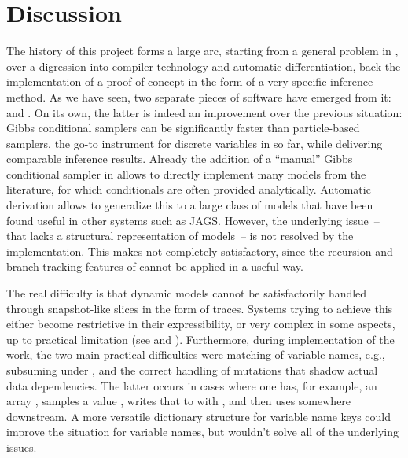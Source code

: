 \chapter{Discussion}
\label{cha:discussion}

The history of this project forms a large arc, starting from a general problem in \turingjl{}, over
a digression into compiler technology and automatic differentiation, back the implementation of a
proof of concept in the form of a very specific inference method.  As we have seen, two separate
pieces of software have emerged from it: \irtrackerjl{} and \autogibbsjl{}.  On its own, the latter
is indeed an improvement over the previous situation: Gibbs conditional samplers can be
significantly faster than particle-based samplers, the go-to instrument for discrete variables in
\turingjl{} so far, while delivering comparable inference results.  Already the addition of a
\enquote{manual} Gibbs conditional sampler in \turingjl{} allows to directly implement many models
from the literature, for which conditionals are often provided analytically.  Automatic derivation
allows to generalize this to a large class of models that have been found useful in other systems
such as JAGS.  However, the underlying issue~-- that \turingjl{} lacks a structural representation
of models~-- is not resolved by the implementation.  This makes \autogibbsjl{} not
completely satisfactory, since the recursion and branch tracking features of \irtrackerjl{} cannot
be applied in a useful way.

The real difficulty is that dynamic models cannot be satisfactorily handled through snapshot-like
slices in the form of traces.  Systems trying to achieve this either become restrictive in their
expressibility, or very complex in some aspects, up to practical limitation (see
\textcite{mansinghka2014venture} and \textcite{goodman2012church}).  Furthermore, during
implementation of the work, the two main practical difficulties were matching of variable names,
e.g., subsuming  under , and the correct handling of mutations that
shadow actual data dependencies.  The latter occurs in cases where one has, for example, an array
, samples a value , writes that to  with , and then
uses  somewhere downstream.  A more versatile dictionary structure for
variable name keys could improve the situation for variable names, but wouldn't solve all of the
underlying issues.

